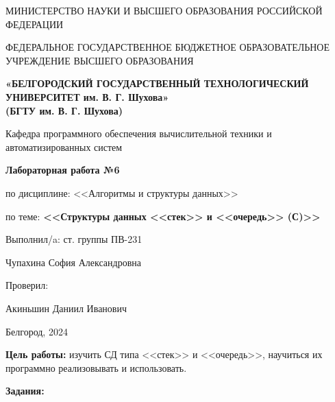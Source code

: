 \documentclass[12pt]{article}
\begin{document}
	\begin{center}
		{\parskip=1cm
			МИНИСТЕРСТВО НАУКИ И ВЫСШЕГО ОБРАЗОВАНИЯ РОССИЙСКОЙ ФЕДЕРАЦИИ
			
			ФЕДЕРАЛЬНОЕ ГОСУДАРСТВЕННОЕ БЮДЖЕТНОЕ ОБРАЗОВАТЕЛЬНОЕ УЧРЕЖДЕНИЕ ВЫСШЕГО ОБРАЗОВАНИЯ
			
			{\bf«БЕЛГОРОДСКИЙ ГОСУДАРСТВЕННЫЙ ТЕХНОЛОГИЧЕСКИЙ УНИВЕРСИТЕТ им. В. Г. Шухова»\\(БГТУ им. В. Г. Шухова)}
			
			
			\begin{figure}[bh]
			\noindent{}
			\end{figure}
			Кафедра программного обеспечения вычислительной техники и автоматизированных систем
		}
		{\parskip=0.25cm
			{\Large 
				{\bf Лабораторная работа №6}
			
				по дисциплине: <<Алгоритмы и структуры данных>>
			
				по теме: {\bf <<Структуры данных <<стек>> и <<очередь>> (С)>>}
			}
		}
	\end{center}
	\begin{flushright}
		{\parskip=3cm Выполнил/a: ст. группы ПВ-231}
		
		Чупахина София Александровна
		
		Проверил:
		
		Акиньшин Даниил Иванович
	\end{flushright}
	\begin{center}
		{\parskip=3cm Белгород, 2024}
	\end{center}
	\newpage
	
	{\bf Цель работы:} изучить СД типа <<стек>> и <<очередь>>, научиться их программно реализовывать и использовать.
	
	
	{\bf Задания:}
	
	
\end{document}
